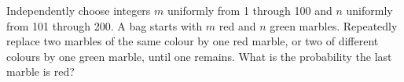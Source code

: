 Independently choose integers $m$ uniformly from 1 through 100 and $n$ uniformly from 101 through 200. A bag starts with $m$ red and $n$ green marbles. Repeatedly replace two marbles of the same colour by one red marble, or two of different colours by one green marble, until one remains. What is the probability the last marble is red?
